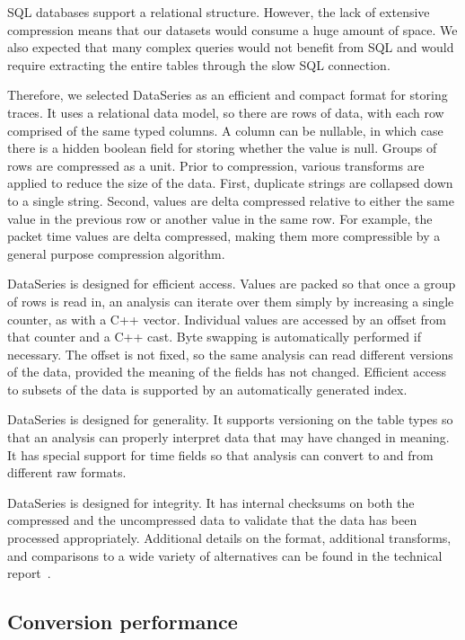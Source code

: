 SQL databases support a relational structure. However, the lack of 
extensive compression means that our datasets would 
consume a huge amount of space. We also expected that many complex
queries would not benefit from SQL and would require extracting
the entire tables through the slow SQL connection.

Therefore, we selected DataSeries as an efficient and compact format
for storing traces.  It uses a relational data model, so
there are rows of data, with each row comprised of the same typed
columns.  A column can be nullable, in which case there is a hidden
boolean field for storing whether the value is null.  Groups of rows
are compressed as a unit.  Prior to compression,
various transforms are applied to reduce the size of the data.  First,
duplicate strings are collapsed down to a single
string.  Second, values are delta compressed relative to either the
same value in the previous row or another value in the same row.  For
example, the packet time values are delta compressed, making them
more compressible by a general purpose compression algorithm.

DataSeries is designed for efficient access. Values are packed so that
once a group of rows is read in, an analysis can iterate over them
simply by increasing a single counter, as with a C++ vector.
Individual values are accessed by an offset from that
counter and a C++ cast.  Byte swapping is automatically
performed if necessary.  The offset is not fixed, so the same analysis can read
different versions of the data, provided the meaning of the fields
has not changed.  Efficient access to subsets of the data is supported
by an automatically generated index.

DataSeries is designed for generality. It supports versioning on the
table types so that an analysis can properly interpret data that may
have changed in meaning.  It has special support for time fields so
that analysis can convert to and from different raw formats.

DataSeries is designed for integrity.  It has internal checksums on
both the compressed and the uncompressed data to validate that the
data has been processed appropriately.  Additional details on the
format, additional transforms, and comparisons to a wide variety of
alternatives can be found in the technical
report~\cite{DSTechnicalReportSnapshot}.

\subsection{Conversion performance}

